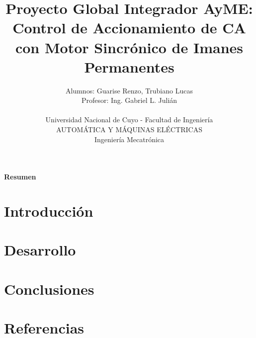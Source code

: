 \documentclass[12pt]{article}
\title{Proyecto Global Integrador AyME:\\
Control de Accionamiento de CA con Motor Sincrónico de Imanes Permanentes}
\author{Alumnos: Guarise Renzo, Trubiano Lucas\\
Profesor: Ing. Gabriel L. Julián\\
\\
Universidad Nacional de Cuyo - Facultad de Ingeniería\\
AUTOMÁTICA Y MÁQUINAS ELÉCTRICAS\\
Ingeniería Mecatrónica}
\begin{document}
\maketitle

\begin{center} %
    \textbf{Resumen}
\end{center}


\newpage


\section{Introducción}

\section{Desarrollo}

\section{Conclusiones}

\section{Referencias}
\end{document}
